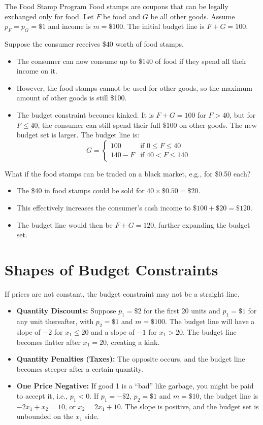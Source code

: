 \begin{examplebox}{The Food Stamp Program}
Food stamps are coupons that can be legally exchanged only for food. Let $F$ be food and $G$ be all other goods. Assume $p_F = p_G = \$1$ and income is $m=\$100$. The initial budget line is $F+G=100$.

Suppose the consumer receives \$40 worth of food stamps.
\begin{itemize}
    \item The consumer can now consume up to \$140 of food if they spend all their income on it.
    \item However, the food stamps cannot be used for other goods, so the maximum amount of other goods is still \$100.
    \item The budget constraint becomes kinked. It is $F+G=100$ for $F > 40$, but for $F \leq 40$, the consumer can still spend their full \$100 on other goods. The new budget set is larger. The budget line is:
    \[ G = \begin{cases} 100 & \text{if } 0 \leq F \leq 40 \\ 140 - F & \text{if } 40 < F \leq 140 \end{cases} \]
\end{itemize}
What if the food stamps can be traded on a black market, e.g., for \$0.50 each?
\begin{itemize}
    \item The \$40 in food stamps could be sold for $40 \times \$0.50 = \$20$.
    \item This effectively increases the consumer's cash income to $\$100 + \$20 = \$120$.
    \item The budget line would then be $F+G=120$, further expanding the budget set.
\end{itemize}
\end{examplebox}

\section{Shapes of Budget Constraints}
If prices are not constant, the budget constraint may not be a straight line.
\begin{itemize}
    \item \textbf{Quantity Discounts:} Suppose $p_1=\$2$ for the first 20 units and $p_1=\$1$ for any unit thereafter, with $p_2=\$1$ and $m=\$100$. The budget line will have a slope of $-2$ for $x_1 \leq 20$ and a slope of $-1$ for $x_1 > 20$. The budget line becomes flatter after $x_1=20$, creating a kink.
    \item \textbf{Quantity Penalties (Taxes):} The opposite occurs, and the budget line becomes steeper after a certain quantity.
    \item \textbf{One Price Negative:} If good 1 is a ``bad'' like garbage, you might be paid to accept it, i.e., $p_1 < 0$. If $p_1 = -\$2$, $p_2=\$1$ and $m=\$10$, the budget line is $-2x_1 + x_2 = 10$, or $x_2 = 2x_1 + 10$. The slope is positive, and the budget set is unbounded on the $x_1$ side.
\end{itemize}

